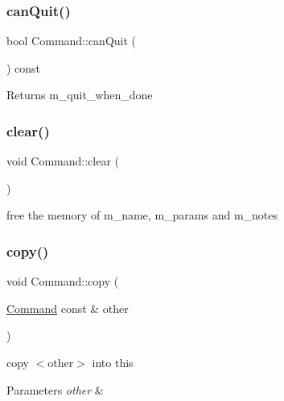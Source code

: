 \mbox{\label{classCommand_a0ec10c9753786caf083aba08cf85afb0}} 
\subsubsection{\texorpdfstring{can\+Quit()}{canQuit()}}
{\footnotesize\ttfamily bool Command\+::can\+Quit (\begin{DoxyParamCaption}{ }\end{DoxyParamCaption}) const}

\begin{DoxyReturn}{Returns}
m\+\_\+quit\+\_\+when\+\_\+done 
\end{DoxyReturn}
\mbox{\label{classCommand_a57fbea0c0d10ef4b184c7ef3eb34590d}} 
\subsubsection{\texorpdfstring{clear()}{clear()}}
{\footnotesize\ttfamily void Command\+::clear (\begin{DoxyParamCaption}{ }\end{DoxyParamCaption})\hspace{0.3cm}{\ttfamily [private]}}



free the memory of m\+\_\+name, m\+\_\+params and m\+\_\+notes 

\mbox{\label{classCommand_afc097ed76cb9fd7135146ec8703e2c3e}} 
\subsubsection{\texorpdfstring{copy()}{copy()}}
{\footnotesize\ttfamily void Command\+::copy (\begin{DoxyParamCaption}\item[{\hyperlink{classCommand}{Command} const \&}]{other }\end{DoxyParamCaption})\hspace{0.3cm}{\ttfamily [private]}}

copy $<$other$>$ into this 
\begin{DoxyParams}{Parameters}
{\em other} & \\
\hline
\end{DoxyParams}
\mbox{\label{classCommand_a378451c967b9d585492a778bab58f803}} 
